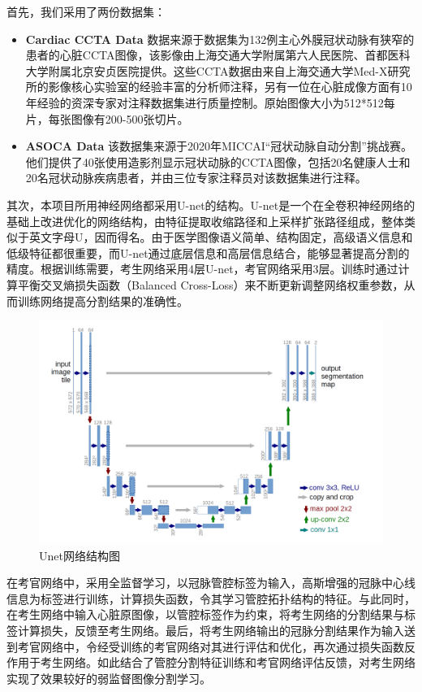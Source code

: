 \documentclass[lang=cn,11pt,a4paper,cite=numbers]{elegantpaper}
\begin{document}
首先，我们采用了两份数据集：

\begin{itemize}
    \item \textbf{Cardiac CCTA Data}
    数据来源于数据集为132例主心外膜冠状动脉有狭窄的患者的心脏CCTA图像，该影像由上海交通大学附属第六人民医院、首都医科大学附属北京安贞医院提供。这些CCTA数据由来自上海交通大学Med-X研究所的影像核心实验室的经验丰富的分析师注释，另有一位在心脏成像方面有10年经验的资深专家对注释数据集进行质量控制。原始图像大小为512*512每片，每张图像有200-500张切片。
    \item \textbf{ASOCA Data} 
    该数据集来源于2020年MICCAI“冠状动脉自动分割”挑战赛。他们提供了40张使用造影剂显示冠状动脉的CCTA图像，包括20名健康人士和20名冠状动脉疾病患者，并由三位专家注释员对该数据集进行注释。
\end{itemize}

其次，本项目所用神经网络都采用U-net的结构。U-net是一个在全卷积神经网络的基础上改进优化的网络结构，由特征提取收缩路径和上采样扩张路径组成，整体类似于英文字母U，因而得名。由于医学图像语义简单、结构固定，高级语义信息和低级特征都很重要，而U-net通过底层信息和高层信息结合，能够显著提高分割的精度。根据训练需要，考生网络采用4层U-net，考官网络采用3层。训练时通过计算平衡交叉熵损失函数（Balanced Cross-Loss）来不断更新调整网络权重参数，从而训练网络提高分割结果的准确性。

\begin{figure}[H]
    \centering
    \includegraphics[scale=0.15]{./image/前期总结/Unet.png}
    \caption{Unet网络结构图}
    \label{fig:Unet}
\end{figure}


在考官网络中，采用全监督学习，以冠脉管腔标签为输入，高斯增强的冠脉中心线信息为标签进行训练，计算损失函数，令其学习管腔拓扑结构的特征。与此同时，在考生网络中输入心脏原图像，以管腔标签作为约束，将考生网络的分割结果与标签计算损失，反馈至考生网络。最后，将考生网络输出的冠脉分割结果作为输入送到考官网络中，令经受训练的考官网络对其进行评估和优化，再次通过损失函数反作用于考生网络。如此结合了管腔分割特征训练和考官网络评估反馈，对考生网络实现了效果较好的弱监督图像分割学习。
\end{document}
